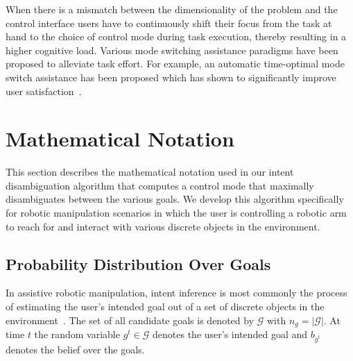 \documentclass[conference]{IEEEtran}
\begin{document}
When there is a mismatch between the dimensionality of the problem and the control interface users have to continuously shift their focus from the task at hand to the choice of control mode during task execution, thereby resulting in a higher cognitive load. Various mode switching assistance paradigms have been proposed to alleviate task effort. For example, an automatic time-optimal mode switch assistance has been proposed which has shown to significantly improve user satisfaction~\citep{herlant2016assistive}. 


\section{Mathematical Notation}\label{sec:math}
This section describes the mathematical notation used in our intent disambiguation algorithm that computes a control mode that maximally disambiguates between the various goals.
We develop this algorithm specifically for robotic manipulation scenarios in which the user is controlling a robotic arm to reach for and interact with various discrete objects in the environment.

\subsection{Probability Distribution Over Goals}\label{ssec:notation}
 In assistive robotic manipulation, intent inference is most commonly the process of estimating the user's intended goal out of a set of discrete objects in the environment~\citep{calli2015ycb}. The set of all candidate goals is denoted by $\mathcal{G}$ with $n_g = \vert\mathcal{G}\vert$.
At time $t$ the random variable $g^t \in \mathcal{G}$ denotes the user's intended goal and $b_{g^t}$ denotes the belief over the goals. 
\end{document}
